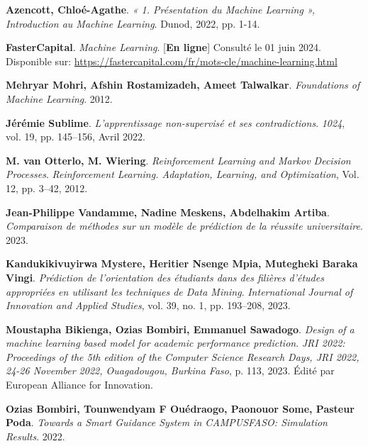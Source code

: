 \begin{thebibliography}{9}
\textbf{Azencott, Chloé-Agathe}. \emph{« 1. Présentation du Machine Learning », Introduction au Machine Learning}. Dunod, 2022, pp. 1-14. 

\textbf{FasterCapital}. \emph{Machine Learning}. [\textbf{En ligne}] Consulté le 01 juin 2024. \\Disponible sur:
\url{https://fastercapital.com/fr/mots-cle/machine-learning.html}

\textbf{Mehryar Mohri, Afshin Rostamizadeh, Ameet Talwalkar}. \emph{Foundations of Machine Learning}. 2012.

\textbf{Jérémie Sublime}. \emph{L'apprentissage non-supervisé et ses contradictions}. \emph{1024}, vol. 19, pp. 145--156, Avril 2022.

\textbf{M. van Otterlo, M. Wiering}. \emph{Reinforcement Learning and Markov Decision Processes}. \emph{Reinforcement Learning. Adaptation, Learning, and Optimization}, Vol. 12, pp. 3–42, 2012.


\textbf{Jean-Philippe Vandamme, Nadine Meskens, Abdelhakim Artiba}. \emph{Comparaison de méthodes sur un modèle de prédiction de la réussite universitaire}. 2023.

\textbf{Kandukikivuyirwa Mystere, Heritier Nsenge Mpia, Mutegheki Baraka Vingi}. \emph{Prédiction de l'orientation des étudiants dans des filières d'études appropriées en utilisant les techniques de Data Mining}. \emph{International Journal of Innovation and Applied Studies}, vol. 39, no. 1, pp. 193--208, 2023.

\textbf{Moustapha Bikienga, Ozias Bombiri, Emmanuel Sawadogo}. \emph{Design of a machine learning based model for academic performance prediction}. \emph{JRI 2022: Proceedings of the 5th edition of the Computer Science Research Days, JRI 2022, 24-26 November 2022, Ouagadougou, Burkina Faso}, p. 113, 2023. Édité par European Alliance for Innovation.

\textbf{Ozias Bombiri, Tounwendyam F Ouédraogo, Paonouor Some, Pasteur Poda}. \emph{Towards a Smart Guidance System in CAMPUSFASO: Simulation Results}. 2022.

\end{thebibliography}